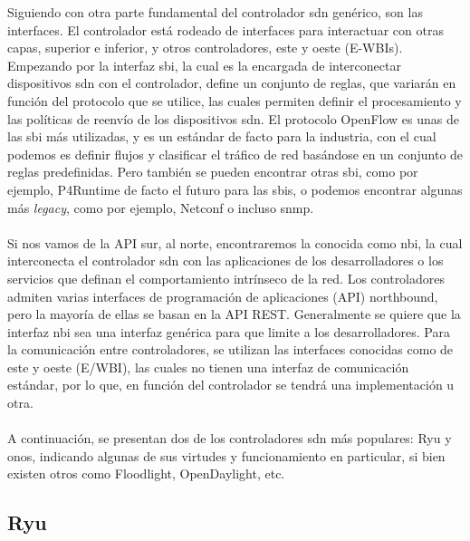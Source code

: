 Siguiendo con otra parte fundamental del controlador \gls{sdn} genérico, son las interfaces. El controlador está rodeado de interfaces para interactuar con otras capas, superior e inferior, y otros controladores, este y oeste (E-WBIs). Empezando por la interfaz \gls{sbi}, la cual es la encargada de interconectar dispositivos \gls{sdn} con el controlador, define un conjunto de reglas, que variarán en función del protocolo que se utilice, las cuales permiten definir el procesamiento y las políticas de reenvío de los dispositivos \gls{sdn}. El protocolo OpenFlow es unas de las \gls{sbi} más utilizadas, y es un estándar de facto para la industria, con el cual podemos es definir flujos y clasificar el tráfico de red basándose en un conjunto de reglas predefinidas. Pero también se pueden encontrar otras \gls{sbi}, como por ejemplo, P4Runtime de facto el futuro para las \gls{sbi}s, o podemos encontrar algunas más \textit{legacy}, como por ejemplo, Netconf o incluso \gls{snmp}.\\
\\
Si nos vamos de la API sur, al norte, encontraremos la conocida como \gls{nbi}, la cual interconecta el controlador \gls{sdn} con las aplicaciones de los desarrolladores o los servicios que definan el comportamiento intrínseco de la red. Los controladores admiten varias interfaces de programación de aplicaciones (API) northbound, pero la mayoría de ellas se basan en la API REST. Generalmente se quiere que la interfaz \gls{nbi} sea una interfaz genérica para que limite a los desarrolladores. Para la comunicación entre controladores, se utilizan las interfaces conocidas como de este y oeste (E/WBI), las cuales no tienen una interfaz de comunicación estándar, por lo que, en función del controlador se tendrá una implementación u otra.\\
\\
A continuación, se presentan dos de los controladores \gls{sdn} más populares: Ryu y \gls{onos}, indicando algunas de sus virtudes y funcionamiento en particular, si bien existen otros como Floodlight, OpenDaylight, etc.

\subsection{Ryu}
\label{subsec:ryu}


